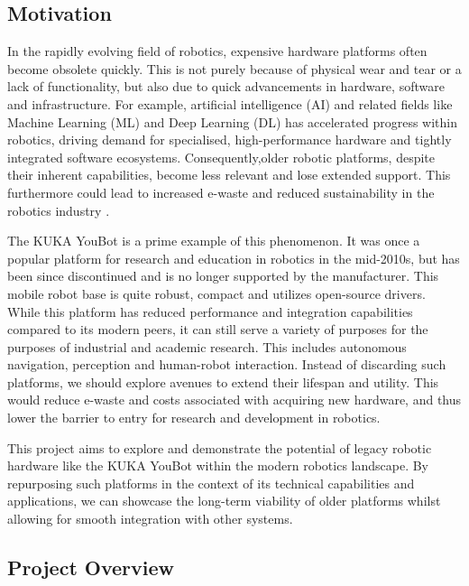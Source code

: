 \documentclass[a4paper, 12pt]{article}
\newif\ifshownotes
\newcommand{\notes}[1]{\ifshownotes\textcolor{blue}{#1}\fi}
\begin{document}
    \subsection{Motivation}

    \notes{draft \#2}

    In the rapidly evolving field of robotics, expensive hardware platforms often become obsolete quickly. This is not purely because of physical wear and tear or a lack of functionality, but also due to quick advancements in hardware, software and infrastructure. For example, artificial intelligence (AI) and related fields like Machine Learning (ML) and Deep Learning (DL) has accelerated progress within robotics, driving demand for specialised, high-performance hardware and tightly integrated software ecosystems. Consequently,older robotic platforms, despite their inherent capabilities, become less relevant and lose extended support. This furthermore could lead to increased e-waste and reduced sustainability in the robotics industry \cite{mcgloin2023introducing}. 

    The KUKA YouBot is a prime example of this phenomenon. It was once a popular platform for research and education in robotics in the mid-2010s, but has been since discontinued and is no longer supported by the manufacturer. This mobile robot base is quite robust, compact and utilizes open-source drivers. While this platform has reduced performance and integration capabilities compared to its modern peers, it can still serve a variety of purposes for the purposes of industrial and academic research. This includes autonomous navigation, perception and human-robot interaction. Instead of discarding such platforms, we should explore avenues to extend their lifespan and utility. This would reduce e-waste and costs associated with acquiring new hardware, and thus lower the barrier to entry for research and development in robotics.
    
    This project aims to explore and demonstrate the potential of legacy robotic hardware like the KUKA YouBot within the modern robotics landscape. By repurposing such platforms in the context of its technical capabilities and applications, we can showcase the long-term viability of older platforms whilst allowing for smooth integration with other systems. 

    \subsection{Project Overview}
\end{document}
